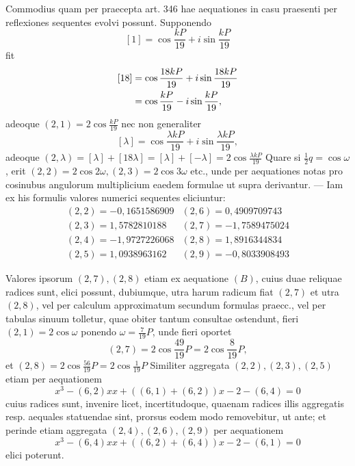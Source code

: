 Commodius quam per praecepta art. 346 hae aequationes in casu praesenti per reflexiones sequentes evolvi possunt. Supponendo \[[1]=\cos\frac{kP}{19}+i\sin\frac{kP}{19}\] fit \[\begin{aligned}
\relax[18]&=\cos\frac{18kP}{19}+i\sin\frac{18kP}{19}\\
&=\cos\frac{kP}{19}-i\sin\frac{kP}{19},
\end{aligned}\] adeoque \((2,1)=2\cos\frac{kP}{19}\) nec non generaliter \[[\lambda]=\cos\frac{\lambda kP}{19}+i\sin\frac{\lambda kP}{19},\] adeoque \((2,\lambda)=[\lambda]+[18\lambda]=[\lambda]+[-\lambda]=2\cos\frac{\lambda kP}{19}\) Quare si \(\frac12q=\cos\omega\), erit \((2,2)=2\cos2\omega,\allowbreak (2,3)=2\cos3\omega\) etc., unde per aequationes notas pro cosinubus angulorum multiplicium eaedem formulae ut supra derivantur. — Iam ex his formulis valores numerici sequentes eliciuntur: \[\begin{array}{r|r}(2,2)=-0{,}1651586909&(2,6)=0{,}4909709743\\(2,3)=1{,}5782810188&(2,7)=-1{,}7589475024\\(2,4)=-1{,}9727226068&(2,8)=1{,}8916344834\\(2,5)=1{,}0938963162&(2,9)=-0{,}8033908493\end{array}\]

Valores ipsorum \((2,7),\allowbreak (2,8)\) etiam ex aequatione \((B)\), cuius duae reliquae radices sunt, elici possunt, dubiumque, utra harum radicum fiat \((2,7)\) et utra \((2,8)\), vel per calculum approximatum secundum formulas praecc., vel per tabulas sinuum tolletur, quae obiter tantum consultae ostendunt, fieri \((2,1)=2\cos\omega\) ponendo \(\omega=\frac7{19}P\), unde fieri oportet \[(2,7)=2\cos\frac{49}{19}P=2\cos\frac8{19}P,\] et \((2,8)=2\cos\frac{56}{19}P=2\cos\frac1{19}P\) Similiter aggregata \((2,2),\allowbreak (2,3),\allowbreak (2,5)\) etiam per aequationem \[x^3-(6,2)xx+((6,1)+(6,2))x-2-(6,4)=0\] cuius radices sunt, invenire licet, incertitudoque, quaenam radices illis aggregatis resp. aequales statuendae sint, prorsus eodem modo removebitur, ut ante; et perinde etiam aggregata \((2,4),\allowbreak (2,6),\allowbreak (2,9)\) per aequationem \[x^3-(6,4)xx+((6,2)+(6,4))x-2-(6,1)=0\] elici poterunt.


